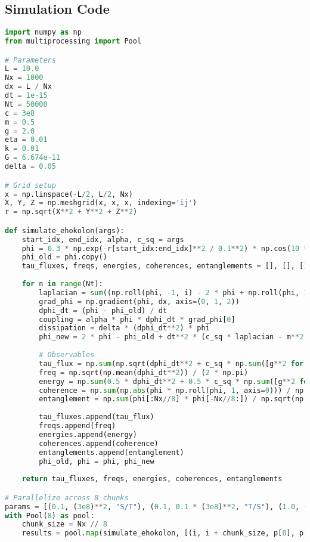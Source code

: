 \documentclass[11pt]{article}
\begin{document}
\subsection{Simulation Code}
\begin{lstlisting}[language=Python, caption={Fluxonic Time Evolution Simulation}, label=lst:time]
import numpy as np
from multiprocessing import Pool

# Parameters
L = 10.0
Nx = 1000
dx = L / Nx
dt = 1e-15
Nt = 50000
c = 3e8
m = 0.5
g = 2.0
eta = 0.01
k = 0.01
G = 6.674e-11
delta = 0.05

# Grid setup
x = np.linspace(-L/2, L/2, Nx)
X, Y, Z = np.meshgrid(x, x, x, indexing='ij')
r = np.sqrt(X**2 + Y**2 + Z**2)

def simulate_ehokolon(args):
    start_idx, end_idx, alpha, c_sq = args
    phi = 0.3 * np.exp(-r[start_idx:end_idx]**2 / 0.1**2) * np.cos(10 * X[start_idx:end_idx]) + 0.1 * np.random.rand(Nx//8, Nx, Nx)
    phi_old = phi.copy()
    tau_fluxes, freqs, energies, coherences, entanglements = [], [], [], [], []
    
    for n in range(Nt):
        laplacian = sum((np.roll(phi, -1, i) - 2 * phi + np.roll(phi, 1, i)) / dx**2 for i in range(3))
        grad_phi = np.gradient(phi, dx, axis=(0, 1, 2))
        dphi_dt = (phi - phi_old) / dt
        coupling = alpha * phi * dphi_dt * grad_phi[0]
        dissipation = delta * (dphi_dt**2) * phi
        phi_new = 2 * phi - phi_old + dt**2 * (c_sq * laplacian - m**2 * phi - g * phi**3 - eta * phi**5 + 8 * np.pi * G * k * phi**2 + coupling - dissipation)
        
        # Observables
        tau_flux = np.sum(np.sqrt(dphi_dt**2 + c_sq * np.sum([g**2 for g in grad_phi], axis=0))) * dx**3
        freq = np.sqrt(np.mean(dphi_dt**2)) / (2 * np.pi)
        energy = np.sum(0.5 * dphi_dt**2 + 0.5 * c_sq * np.sum([g**2 for g in grad_phi], axis=0) + 0.5 * m**2 * phi**2 + 0.25 * g * phi**4 + (1/6) * eta * phi**6) * dx**3
        coherence = np.sum(np.abs(phi * np.roll(phi, 1, axis=0))) / np.sum(phi**2)
        entanglement = np.sum(phi[:Nx//8] * phi[-Nx//8:]) / np.sqrt(np.sum(phi[:Nx//8]**2) * np.sum(phi[-Nx//8:]**2))
        
        tau_fluxes.append(tau_flux)
        freqs.append(freq)
        energies.append(energy)
        coherences.append(coherence)
        entanglements.append(entanglement)
        phi_old, phi = phi, phi_new
    
    return tau_fluxes, freqs, energies, coherences, entanglements

# Parallelize across 8 chunks
params = [(0.1, (3e8)**2, "S/T"), (0.1, 0.1 * (3e8)**2, "T/S"), (1.0, (3e8)**2, "S=T")]
with Pool(8) as pool:
    chunk_size = Nx // 8
    results = pool.map(simulate_ehokolon, [(i, i + chunk_size, p[0], p[1]) for i in range(0, Nx, chunk_size) for p in params])
\end{lstlisting}
\end{document}
